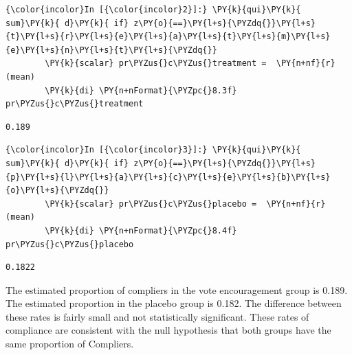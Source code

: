 \documentclass[11pt,notitlepage]{article}\usepackage[]{graphicx}\usepackage[]{color}
\makeatletter
\newenvironment{kframe}{%
 \def\at@end@of@kframe{}%
 \ifinner\ifhmode%
  \def\at@end@of@kframe{\end{minipage}}%
  \begin{minipage}{\columnwidth}%
 \fi\fi%
 \def\FrameCommand##1{\hskip\@totalleftmargin \hskip-\fboxsep
 \colorbox{shadecolor}{##1}\hskip-\fboxsep
     \hskip-\linewidth \hskip-\@totalleftmargin \hskip\columnwidth}%
 \MakeFramed {\advance\hsize-\width
   \@totalleftmargin\z@ \linewidth\hsize
   \@setminipage}}%
 {\par\unskip\endMakeFramed%
 \at@end@of@kframe}
\newenvironment{knitrout}{}{} %
\makeatother
\begin{document}
\begin{enumerate}[a)]
\begin{knitrout}
\begin{kframe}
    \begin{Verbatim}[commandchars=\\\{\}]
{\color{incolor}In [{\color{incolor}2}]:} \PY{k}{qui}\PY{k}{ sum}\PY{k}{ d}\PY{k}{ if} z\PY{o}{==}\PY{l+s}{\PYZdq{}}\PY{l+s}{t}\PY{l+s}{r}\PY{l+s}{e}\PY{l+s}{a}\PY{l+s}{t}\PY{l+s}{m}\PY{l+s}{e}\PY{l+s}{n}\PY{l+s}{t}\PY{l+s}{\PYZdq{}}
        \PY{k}{scalar} pr\PYZus{}c\PYZus{}treatment =  \PY{n+nf}{r}(mean)
        \PY{k}{di} \PY{n+nFormat}{\PYZpc{}8.3f} pr\PYZus{}c\PYZus{}treatment
\end{Verbatim}

    \begin{Verbatim}[commandchars=\\\{\}]
   0.189
    \end{Verbatim}

    \begin{Verbatim}[commandchars=\\\{\}]
{\color{incolor}In [{\color{incolor}3}]:} \PY{k}{qui}\PY{k}{ sum}\PY{k}{ d}\PY{k}{ if} z\PY{o}{==}\PY{l+s}{\PYZdq{}}\PY{l+s}{p}\PY{l+s}{l}\PY{l+s}{a}\PY{l+s}{c}\PY{l+s}{e}\PY{l+s}{b}\PY{l+s}{o}\PY{l+s}{\PYZdq{}}
        \PY{k}{scalar} pr\PYZus{}c\PYZus{}placebo =  \PY{n+nf}{r}(mean)
        \PY{k}{di} \PY{n+nFormat}{\PYZpc{}8.4f} pr\PYZus{}c\PYZus{}placebo
\end{Verbatim}

    \begin{Verbatim}[commandchars=\\\{\}]
  0.1822
    \end{Verbatim}
\end{kframe}
\end{knitrout}

The estimated proportion of compliers in the vote encouragement group is 0.189. The estimated proportion in the placebo group is 0.182. The difference between these rates is fairly small and not statistically significant. These rates of compliance are consistent with the null hypothesis that both groups have the same proportion of Compliers.


\end{enumerate}
\end{document}

